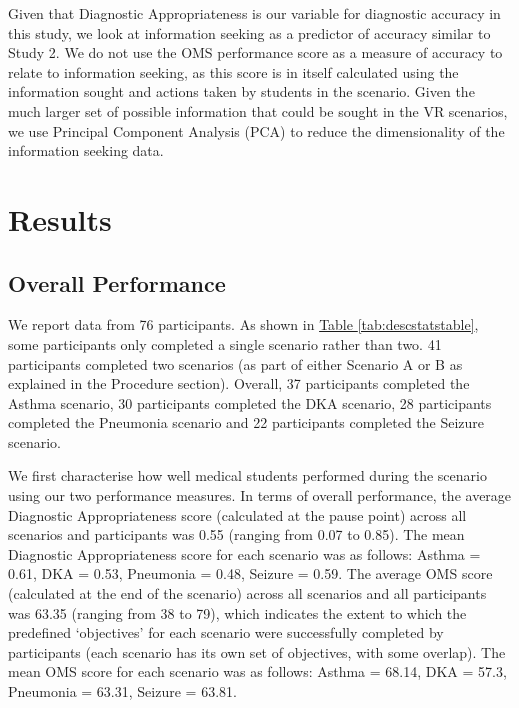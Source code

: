 \documentclass[a4paper, nobind]{templates/ociamthesis}
\begin{document}
\hfill\break
Given that Diagnostic Appropriateness is our variable for diagnostic accuracy in this study, we look at information seeking as a predictor of accuracy similar to Study 2. We do not use the OMS performance score as a measure of accuracy to relate to information seeking, as this score is in itself calculated using the information sought and actions taken by students in the scenario. Given the much larger set of possible information that could be sought in the VR scenarios, we use Principal Component Analysis (PCA) to reduce the dimensionality of the information seeking data.

\section{Results}\label{results}

\subsection{Overall Performance}\label{overall-performance}

We report data from 76 participants. As shown in \hyperref[tab:descstatstable]{Table \ref{tab:descstatstable}}, some participants only completed a single scenario rather than two. 41 participants completed two scenarios (as part of either Scenario A or B as explained in the Procedure section). Overall, 37 participants completed the Asthma scenario, 30 participants completed the DKA scenario, 28 participants completed the Pneumonia scenario and 22 participants completed the Seizure scenario.

\hfill\break
We first characterise how well medical students performed during the scenario using our two performance measures. In terms of overall performance, the average Diagnostic Appropriateness score (calculated at the pause point) across all scenarios and participants was 0.55 (ranging from 0.07 to 0.85). The mean Diagnostic Appropriateness score for each scenario was as follows: Asthma = 0.61, DKA = 0.53, Pneumonia = 0.48, Seizure = 0.59. The average OMS score (calculated at the end of the scenario) across all scenarios and all participants was 63.35 (ranging from 38 to 79), which indicates the extent to which the predefined `objectives' for each scenario were successfully completed by participants (each scenario has its own set of objectives, with some overlap). The mean OMS score for each scenario was as follows: Asthma = 68.14, DKA = 57.3, Pneumonia = 63.31, Seizure = 63.81.
\end{document}
